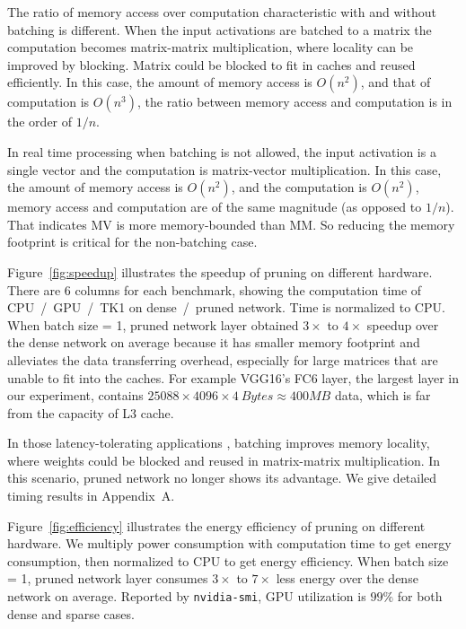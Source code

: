 \documentclass{article} %
\begin{document}
The ratio of memory access over computation characteristic with and without batching is different. When the input activations are batched to a matrix the computation becomes matrix-matrix multiplication, where locality can be improved by blocking. Matrix could be blocked to fit in caches and reused efficiently. In this case, the amount of memory access is $O(n^2)$, and that of computation is $O(n^3)$, the ratio between memory access and computation is in the order of $1/n$. 

In real time processing when batching is not allowed, the input activation is a single vector and the computation is matrix-vector multiplication. In this case, the amount of memory access is $O(n^2)$, and the computation is $O(n^2)$, memory access and computation are of the same magnitude (as opposed to $1/n$). That indicates MV is more memory-bounded than MM. So reducing the memory footprint is critical for the non-batching case. 


Figure~\ref{fig:speedup} illustrates the speedup of pruning on different hardware. There are 6 columns for each benchmark, showing the computation time of CPU~/~GPU~/~TK1 on dense~/~pruned network. Time is normalized to CPU.
When batch size = 1, pruned network layer obtained $3\times$ to $4\times$ speedup over the dense network on average because it has smaller memory footprint and alleviates the data transferring overhead, especially for large matrices that are unable to fit into the caches. For example VGG16's FC6 layer, the largest layer in our experiment, contains $25088 \times 4096  \times 4~Bytes \approx 400MB$ data, which is far from the capacity of L3 cache.

In those latency-tolerating applications , batching improves memory locality, where weights could be blocked and reused in matrix-matrix multiplication. In this scenario, pruned network no longer shows its advantage. We give detailed timing results in Appendix~A.

Figure~\ref{fig:efficiency} illustrates the energy efficiency of pruning on different hardware. We multiply power consumption with computation time to get energy consumption, then normalized to CPU to get energy efficiency. 
When batch size = 1, pruned network layer consumes $3\times$ to $7\times$ less energy over the dense network on average. Reported by \texttt{nvidia-smi}, GPU utilization is $99\%$ for both dense and sparse cases. 





\end{document}
